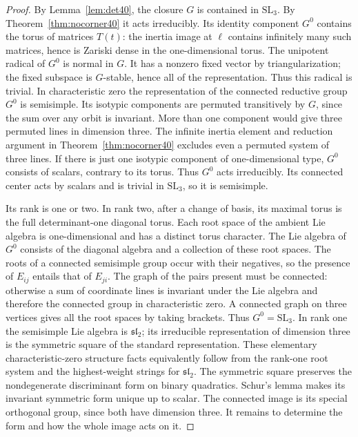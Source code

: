 \documentclass[a4paper,11pt]{article}
\theoremstyle{definition}
\theoremstyle{remark}
\numberwithin{equation}{section}
\begin{document}
\begin{proof}
By Lemma~\ref{lem:det40}, the closure \(G\) is contained in \(\mathrm{SL}_3\). By Theorem~\ref{thm:nocorner40} it acts irreducibly. Its identity component \(G^0\) contains the torus of matrices \(T(t)\): the inertia image at \(\ell\) contains infinitely many such matrices, hence is Zariski dense in the one-dimensional torus. The unipotent radical of \(G^0\) is normal in \(G\). It has a nonzero fixed vector by triangularization; the fixed subspace is \(G\)-stable, hence all of the representation. Thus this radical is trivial. In characteristic zero the representation of the connected reductive group \(G^0\) is semisimple. Its isotypic components are permuted transitively by \(G\), since the sum over any orbit is invariant. More than one component would give three permuted lines in dimension three. The infinite inertia element and reduction argument in Theorem~\ref{thm:nocorner40} excludes even a permuted system of three lines. If there is just one isotypic component of one-dimensional type, \(G^0\) consists of scalars, contrary to its torus. Thus \(G^0\) acts irreducibly. Its connected center acts by scalars and is trivial in \(\mathrm{SL}_3\), so it is semisimple.

Its rank is one or two. In rank two, after a change of basis, its maximal torus is the full determinant-one diagonal torus. Each root space of the ambient Lie algebra is one-dimensional and has a distinct torus character. The Lie algebra of \(G^0\) consists of the diagonal algebra and a collection of these root spaces. The roots of a connected semisimple group occur with their negatives, so the presence of \(E_{ij}\) entails that of \(E_{ji}\). The graph of the pairs present must be connected: otherwise a sum of coordinate lines is invariant under the Lie algebra and therefore the connected group in characteristic zero. A connected graph on three vertices gives all the root spaces by taking brackets. Thus \(G^0=\mathrm{SL}_3\). In rank one the semisimple Lie algebra is \(\mathfrak{sl}_2\); its irreducible representation of dimension three is the symmetric square of the standard representation. These elementary characteristic-zero structure facts equivalently follow from the rank-one root system and the highest-weight strings for \(\mathfrak{sl}_2\). The symmetric square preserves the nondegenerate discriminant form on binary quadratics. Schur's lemma makes its invariant symmetric form unique up to scalar. The connected image is its special orthogonal group, since both have dimension three. It remains to determine the form and how the whole image acts on it.


\end{proof}
\end{document}
